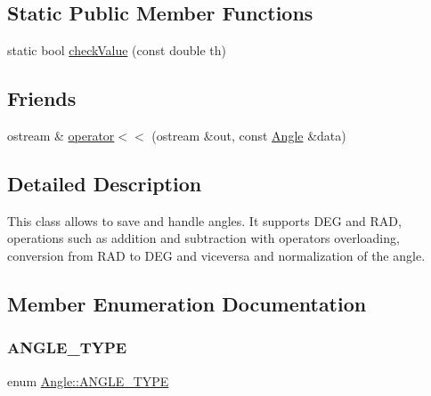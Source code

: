 \subsection*{Static Public Member Functions}
\begin{DoxyCompactItemize}
\item 
static bool \mbox{\hyperlink{class_angle_a5a7714013699b70d5099bd40985288f1}{check\+Value}} (const double th)
\end{DoxyCompactItemize}
\subsection*{Friends}
\begin{DoxyCompactItemize}
\item 
ostream \& \mbox{\hyperlink{class_angle_a075a4a2521a314d707922253ebf03b4e}{operator$<$$<$}} (ostream \&out, const \mbox{\hyperlink{class_angle}{Angle}} \&data)
\end{DoxyCompactItemize}


\subsection{Detailed Description}
This class allows to save and handle angles. It supports D\+EG and R\+AD, operations such as addition and subtraction with operators overloading, conversion from R\+AD to D\+EG and viceversa and normalization of the angle. 

\subsection{Member Enumeration Documentation}
\mbox{\label{class_angle_a4f7b9849ce8780bcba95ca3ee45cff77}} 
\subsubsection{\texorpdfstring{ANGLE\_TYPE}{ANGLE\_TYPE}}
{\footnotesize\ttfamily enum \mbox{\hyperlink{class_angle_a4f7b9849ce8780bcba95ca3ee45cff77}{Angle\+::\+A\+N\+G\+L\+E\+\_\+\+T\+Y\+PE}}}

